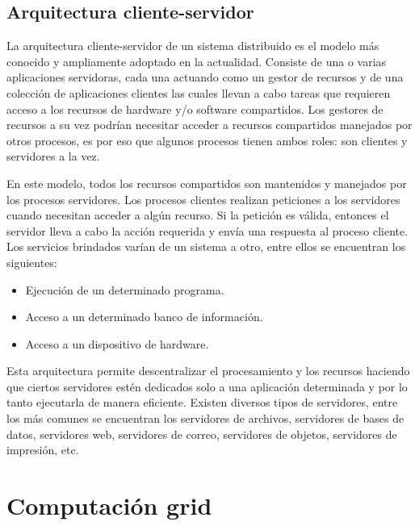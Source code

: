\begin{itemize}
\end{itemize}

\subsection{Arquitectura cliente-servidor}

La arquitectura cliente-servidor de un sistema distribuido es el modelo más conocido y ampliamente adoptado en la actualidad. Consiste de una o varias aplicaciones servidoras,
 cada una actuando como un gestor de recursos y de una colección de aplicaciones clientes las cuales llevan a cabo tareas que requieren acceso a los recursos de hardware y/o software compartidos.
Los gestores de recursos a su vez podrían necesitar acceder a recursos compartidos manejados por otros procesos, es por eso que algunos procesos tienen ambos roles: son clientes y servidores a la vez. 

En este modelo, todos los recursos compartidos son mantenidos y manejados por los procesos servidores. Los procesos clientes realizan peticiones a los servidores cuando necesitan acceder a algún recurso.
Si la petición es válida, entonces el servidor lleva a cabo la acción requerida y envía una respuesta al proceso cliente.\\

Los servicios brindados varían de un sistema a otro, entre ellos se encuentran los siguientes:

\begin{itemize}
 \item  Ejecución de un determinado programa.
 \item  Acceso a un determinado banco de información.
 \item  Acceso a un dispositivo de hardware.
\end{itemize}

Esta arquitectura permite descentralizar el procesamiento y los recursos haciendo que ciertos servidores estén dedicados solo a una aplicación determinada y por lo tanto ejecutarla de manera eficiente.
Existen diversos tipos de servidores, entre los más comunes se encuentran los servidores de archivos, servidores de bases de datos, servidores web, servidores de correo, servidores de objetos, servidores de impresión, etc.


\section{Computación grid}

